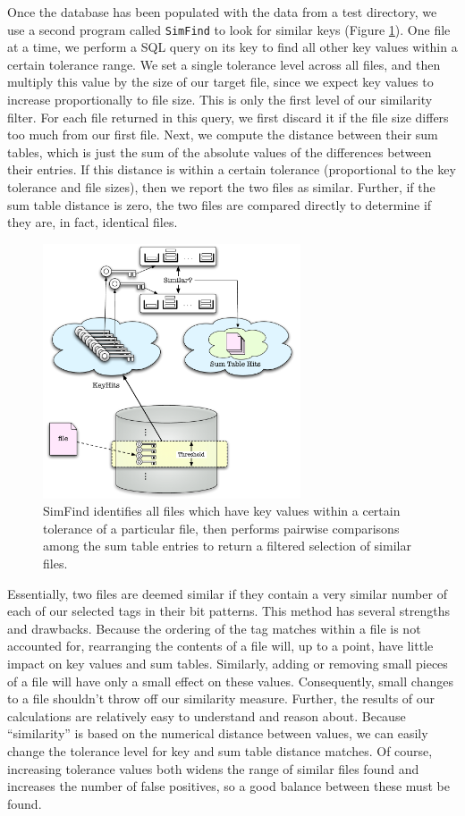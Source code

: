 \documentclass[10pt, twocolumn]{article}
\begin{document}
Once the database has been populated with the data from a test directory, we use a second program called {\tt SimFind} to look for similar keys (Figure \ref{simFind}).  One file at a time, we perform a SQL query on its key to find all other key values within a certain tolerance range.  We set a single tolerance level across all files, and then multiply this value by the size of our target file, since we expect key values to increase proportionally to file size.  This is only the first level of our similarity filter.  For each file returned in this query, we first discard it if the file size differs too much from our first file.  Next, we compute the distance between their sum tables, which is just the sum of the absolute values of the differences between their entries.  If this distance is within a certain tolerance (proportional to the key tolerance and file sizes), then we report the two files as similar.  Further, if the sum table distance is zero, the two files are compared directly to determine if they are, in fact, identical files.

 \begin{figure}[h] 
 \centering
\includegraphics[width= 3in]{simFind.pdf}
\caption{SimFind identifies all files which have key values within a certain tolerance of a particular file, then performs pairwise comparisons among the sum table entries to return a filtered selection of similar files.}
\label{simFind} 
\end{figure}   

Essentially, two files are deemed similar if they contain a very similar number of each of our selected tags in their bit patterns.  This method has several strengths and drawbacks.  Because the ordering of the tag matches within a file is not accounted for, rearranging the contents of a file will, up to a point, have little impact on key values and sum tables.  Similarly, adding or removing small pieces of a file will have only a small effect on these values.  Consequently, small changes to a file shouldn't throw off our similarity measure.  Further, the results of our calculations are relatively easy to understand and reason about.  Because ``similarity'' is based on the numerical distance between values, we can easily change the tolerance level for key and sum table distance matches.  Of course, increasing tolerance values both widens the range of similar files found and increases the number of false positives, so a good balance between these must be found.
\end{document}
